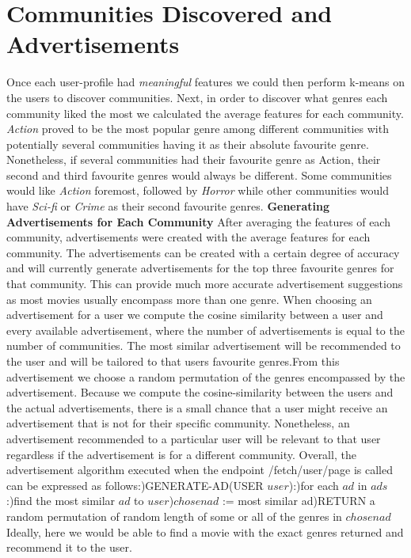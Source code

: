 \documentclass{article}
\newcommand\tab[1][1cm]{\hspace*{#1}}
\begin{document}
\section{Communities Discovered and Advertisements}
Once each user-profile had \textit{meaningful} features we could then perform k-means on the users to discover communities. Next, in order to discover what genres each community liked the most we calculated the average features for each community. \textit{Action} proved to be the most popular genre among different communities with potentially several communities having it as their absolute favourite genre. Nonetheless, if several communities had their favourite genre as Action, their second and third favourite genres would always be different. Some communities would like \textit{Action} foremost, followed by \textit{Horror} while other communities would have \textit{Sci-fi} or \textit{Crime} as their second favourite genres.\newline\newline
\textbf{Generating Advertisements for Each Community}\newline
After averaging the features of each community, advertisements were created with the average features for each community. The advertisements can be created with a certain degree of accuracy and will currently generate advertisements for the top three favourite genres for that community. This can provide much more accurate advertisement suggestions as most movies usually encompass more than one genre. When choosing an advertisement for a user we compute the cosine similarity between a user and every available advertisement, where the number of advertisements is equal to the number of communities. The most similar advertisement will be recommended to the user and will be tailored to that users favourite genres.From this advertisement we choose a random permutation of the genres encompassed by the advertisement. Because we compute the cosine-similarity between the users and the actual advertisements, there is a small chance that a user might receive an advertisement that is not for their specific community. Nonetheless, an advertisement recommended to a particular user will be relevant to that user regardless if the advertisement is for a different community. \newline\newline
Overall, the advertisement algorithm executed when the endpoint  /fetch/{user}/{page} is called can be expressed as follows:)\tab  GENERATE-AD(USER $user$):)\tab\tab for each $ad$ in $ads$:)\tab\tab\tab find the most similar $ad$ to $user$)\tab\tab $chosenad$ := most similar ad)\tab RETURN a random permutation of random length of some or all of the genres in $chosenad$\newline\newline
Ideally, here we would be able to find a movie with the exact genres returned and recommend it to the user. 
\end{document}
